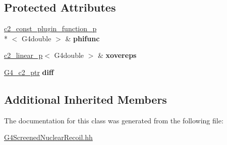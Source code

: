 \subsection*{Protected Attributes}
\begin{DoxyCompactItemize}
\item 
\hypertarget{classG4ScreenedCoulombClassicalKinematics_a8f5d883788d232da756cde3342b610cc}{\hyperlink{classc2__const__plugin__function__p}{c2\-\_\-const\-\_\-plugin\-\_\-function\-\_\-p}\\*
$<$ G4double $>$ \& {\bfseries phifunc}}\label{classG4ScreenedCoulombClassicalKinematics_a8f5d883788d232da756cde3342b610cc}

\item 
\hypertarget{classG4ScreenedCoulombClassicalKinematics_addbca9f6d5c2acb2966216b2fab20aea}{\hyperlink{classc2__linear__p}{c2\-\_\-linear\-\_\-p}$<$ G4double $>$ \& {\bfseries xovereps}}\label{classG4ScreenedCoulombClassicalKinematics_addbca9f6d5c2acb2966216b2fab20aea}

\item 
\hypertarget{classG4ScreenedCoulombClassicalKinematics_adf3f28f417ca19bbb80f9341b134cd0c}{\hyperlink{classc2__ptr}{G4\-\_\-c2\-\_\-ptr} {\bfseries diff}}\label{classG4ScreenedCoulombClassicalKinematics_adf3f28f417ca19bbb80f9341b134cd0c}

\end{DoxyCompactItemize}
\subsection*{Additional Inherited Members}


The documentation for this class was generated from the following file\-:\begin{DoxyCompactItemize}
\item 
\hyperlink{G4ScreenedNuclearRecoil_8hh}{G4\-Screened\-Nuclear\-Recoil.\-hh}\end{DoxyCompactItemize}
